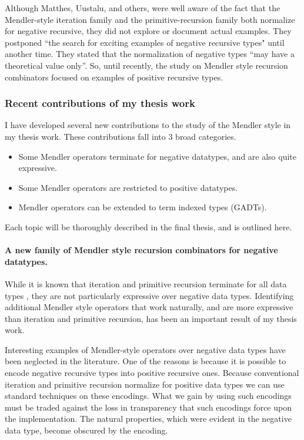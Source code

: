 Although Matthes, Uustalu, and others, were well aware of the fact that
the Mendler-style iteration family and the primitive-recursion family both
normalize for negative recursive, they did not explore or document actual
examples. They postponed ``the search for exciting examples of negative
recursive types" until another time. They stated that the normalization
of negative types ``may have a theoretical value
only''\cite{UusVen99}. So, until recently, the study on Mendler style recursion
combinators focused on examples of positive recursive types.

\subsubsection{Recent contributions of my thesis work}
I have developed several new contributions to the study of the Mendler style
in my thesis work. These contributions fall into 3 broad categories.
\begin{itemize}
\item Some Mendler operators terminate for negative datatypes, and are also quite expressive.
\item Some Mendler operators are restricted to positive datatypes.
\item Mendler operators can be extended to term indexed types (GADTs).
\end{itemize}
Each topic will be thoroughly described in the final thesis, and is outlined here.


\paragraph{A new family of Mendler style recursion combinators for negative datatypes.}

While it is known that iteration and primitive recursion terminate for all data types
\cite{AbeMatUus05,AbeMat04}, they are not particularly expressive over negative
data types. Identifying additional Mendler style operators that work naturally, and are
more expressive than iteration and primitive recursion, has been an important result of
my thesis work.

Interesting examples of Mendler-style operators over negative data types have been
neglected in the literature. One of the reasons is because it is possible to encode
negative recursive types into positive recursive ones. Because conventional iteration and
primitive recursion normalize for positive data types we can use standard techniques on
these encodings. What we gain by using such encodings must be traded against the loss in
transparency that such encodings force upon the implementation. The natural properties,
which were evident in the negative data type, become obscured by the encoding.


